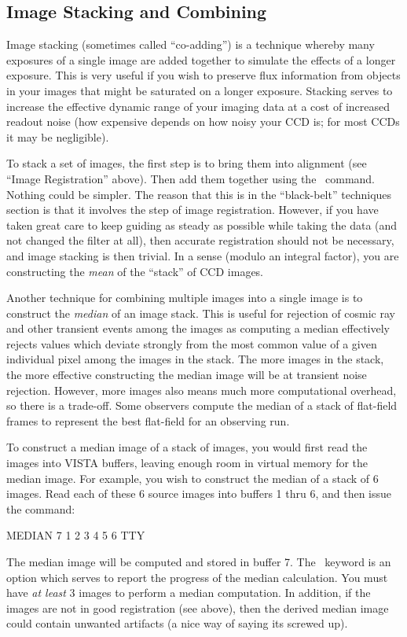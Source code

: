 \subsection{Image Stacking and Combining}
\label{sec:imstack}
Image stacking (sometimes called ``co-adding'') is a technique whereby
many exposures of a single image are added together to simulate the effects of
a longer exposure.  This is very useful if you wish to preserve flux
information from objects in your images that might be saturated on a longer
exposure.  Stacking serves to increase the effective dynamic range of your
imaging data at a cost of increased readout noise (how expensive depends on
how noisy your CCD is; for most CCDs it may be negligible). 

To stack a set of images, the first step is to bring them into alignment (see
``Image Registration'' above).  Then add them together using the \
command.  Nothing could be simpler.  The reason that this is in the
``black-belt'' techniques section is that it involves the step of image
registration.  However, if you have taken great care to keep guiding as steady
as possible while taking the data (and not changed the filter at all), then
accurate registration should not be necessary, and image stacking is then
trivial.  In a sense (modulo an integral factor), you are constructing the
{\it mean} of the ``stack'' of CCD images. 

Another technique for combining multiple images into a single image is to
construct the {\it median} of an image stack.  This is useful for rejection of
cosmic ray and other transient events among the images as computing a median
effectively rejects values which deviate strongly from the most common value
of a given individual pixel among the images in the stack. The more images in
the stack, the more effective constructing the median image will be at
transient noise rejection.  However, more images also means much more
computational overhead, so there is a trade-off.  Some observers compute the
median of a stack of flat-field frames to represent the best flat-field for an
observing run. 

To construct a median image of a stack of images, you would first read the
images into VISTA buffers, leaving enough room in virtual memory for the
median image.  For example, you wish to construct the median of a stack of 6
images.  Read each of these 6 source images into buffers 1 thru 6, and then
issue the command: 
\begin{command}
      \item MEDIAN 7 1 2 3 4 5 6 TTY
\end{command}
The median image will be computed and stored in buffer 7.  The \
keyword is an option which serves to report the progress of the median
calculation.  You must have {\it at least} 3 images to perform a median
computation.  In addition, if the images are not in good registration (see
above), then the derived median image could contain unwanted artifacts (a nice
way of saying its screwed up). 

